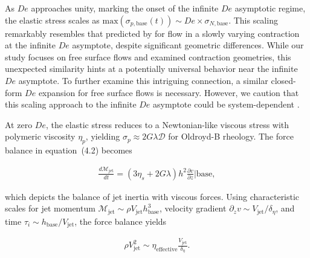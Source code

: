 \documentclass[]{article}
\newcommand{\oo}{\color{magenta} \normalfont}
\newcommand{\bb}{\color{black} \normalfont}
\begin{document}
\begin{enumerate}
	\oo
	As $De$ approaches unity, marking the onset of the infinite $De$ asymptotic regime, the elastic stress scales as $\text{max}(\sigma_{p,\text{base}}(t)) \sim De \times \sigma_{N,\text{base}}$.
	This scaling remarkably resembles that predicted by \citet{boyko2024flow} for flow in a slowly varying contraction at the infinite $De$ asymptote, despite significant geometric differences. While our study focuses on free surface flows and \citet{boyko2024flow} examined contraction geometries, this unexpected similarity hints at a potentially universal behavior near the infinite $De$ asymptote. To further examine this intriguing connection, a similar closed-form $De$ expansion for free surface flows is necessary. However, we caution that this scaling approach to the infinite $De$ asymptote could be system-dependent \citep{hinch2024fast}.

	At zero $De$, the elastic stress reduces to a Newtonian-like viscous stress with polymeric viscosity $\eta_p$, yielding $\sigma_p \approx 2G\lambda\boldsymbol{\mathcal{D}}$ for Oldroyd-B rheology. The force balance in equation~(4.2) becomes
	\bb

	\begin{align}
		\frac{d \mathcal{M}_\text{jet}}{d t} = \left(3\eta_s + 2G\lambda\right)h^2\frac{\partial v}{\partial z}\Bigg|{\text{base}},
		\label{etaeffect}
	\end{align}

	\noindent which depicts the balance of jet inertia with viscous forces.
	\oo Using characteristic scales for jet momentum $\mathcal{M}_{\text{jet}} \sim \rho V_\text{jet} h_{\text{base}}^3$, velocity gradient $\partial_zv \sim V_{\text{jet}}/\delta_\eta$, and time $\tau_i \sim h_{\text{base}}/V_\text{jet}$, the force balance yields\bb

	\begin{align}
		\rho V_{\text{jet}}^2 \sim \eta_{\text{effective}}\frac{V_{\text{jet}}}{\delta_\eta}.
		\label{scaling}
	\end{align}


\end{enumerate}
\end{document}

